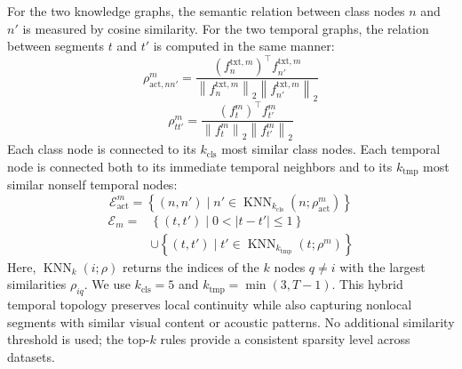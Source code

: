 \documentclass[10pt,journal,twoside]{IEEEtran}
\begin{document}
For the two knowledge graphs, the semantic relation between class nodes $n$ and $n'$ is measured by cosine similarity. For the two temporal graphs, the relation between segments $t$ and $t'$ is computed in the same manner:
\begin{equation}
\rho_{\mathrm{act},nn'}^m
=\frac{\left(f_n^{\mathrm{txt},m}\right)^{\top}f_{n'}^{\mathrm{txt},m}}{\left\|f_n^{\mathrm{txt},m}\right\|_2\left\|f_{n'}^{\mathrm{txt},m}\right\|_2}
\end{equation}
\begin{equation}
\rho_{tt'}^m
=\frac{\left(f_t^m\right)^{\top}f_{t'}^m}{\left\|f_t^m\right\|_2\left\|f_{t'}^m\right\|_2}
\end{equation}
Each class node is connected to its $k_{\mathrm{cls}}$ most similar class nodes. Each temporal node is connected both to its immediate temporal neighbors and to its $k_{\mathrm{tmp}}$ most similar nonself temporal nodes:
\begin{equation}
\mathcal{E}_{\mathrm{act}}^m=
\left\{(n,n')\mid n'\in\operatorname{KNN}_{k_{\mathrm{cls}}}
\left(n;\rho_{\mathrm{act}}^m\right)\right\}
\end{equation}
\begin{equation}
\begin{aligned}
\mathcal{E}_m={}&\left\{(t,t')\mid 0<|t-t'|\le 1\right\}\\
&\cup\left\{(t,t')\mid t'\in\operatorname{KNN}_{k_{\mathrm{tmp}}}
\left(t;\rho^m\right)\right\}
\end{aligned}
\end{equation}
Here, $\operatorname{KNN}_k(i;\rho)$ returns the indices of the $k$ nodes $q\ne i$ with the largest similarities $\rho_{iq}$. We use $k_{\mathrm{cls}}=5$ and $k_{\mathrm{tmp}}=\min(3,T-1)$. This hybrid temporal topology preserves local continuity while also capturing nonlocal segments with similar visual content or acoustic patterns. No additional similarity threshold is used; the top-$k$ rules provide a consistent sparsity level across datasets.
\end{document}
